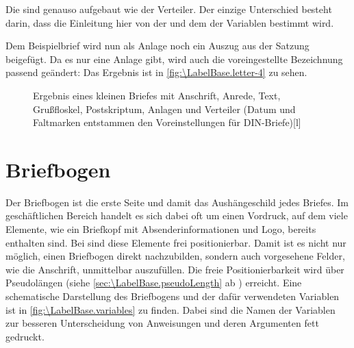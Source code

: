 \begin{Declaration}
\end{Declaration}
Die  sind genauso aufgebaut wie der
Verteiler. Der einzige Unterschied besteht darin, dass die Einleitung
hier von der  und dem  der Variablen
 bestimmt wird.
\begin{Example}
  Dem Beispielbrief wird nun als Anlage noch ein Auszug aus der Satzung
  beigefügt. Da es nur eine Anlage gibt, wird auch die voreingestellte
  Bezeichnung passend geändert:
  Das Ergebnis ist in \autoref{fig:\LabelBase.letter-4} zu sehen.
  \begin{figure}
    \setcapindent{0pt}%
    \begin{captionbeside}{Ergebnis eines kleinen Briefes mit Anschrift, Anrede,
        Text, Grußfloskel, Postskriptum, Anlagen und Verteiler (Datum und
        Faltmarken entstammen den Voreinstellungen für DIN-Briefe)}[l]
    \end{captionbeside}
    \label{fig:\LabelBase.letter-4}
  \end{figure}
\end{Example}
%
\EndIndexGroup
%
\EndIndexGroup




\section{Briefbogen}
\BeginIndexGroup
{}

Der Briefbogen ist die erste Seite und damit das Aushängeschild jedes
Briefes. Im geschäftlichen Bereich handelt es sich dabei oft um einen
Vordruck, auf dem viele Elemente, wie ein Briefkopf mit Absenderinformationen
und Logo, bereits enthalten sind. Bei \KOMAScript{} sind diese Elemente frei
positionierbar. Damit ist es nicht nur möglich, einen Briefbogen direkt
nachzubilden, sondern auch vorgesehene Felder, wie die Anschrift, unmittelbar
auszufüllen. Die freie Positionierbarkeit wird über Pseudolängen (siehe
\autoref{sec:\LabelBase.pseudoLength} ab
) erreicht. Eine schematische
Darstellung des Briefbogens und der dafür verwendeten Variablen ist in
\autoref{fig:\LabelBase.variables} zu finden. Dabei sind die Namen der
Variablen zur besseren Unterscheidung von Anweisungen und deren Argumenten
fett gedruckt.

